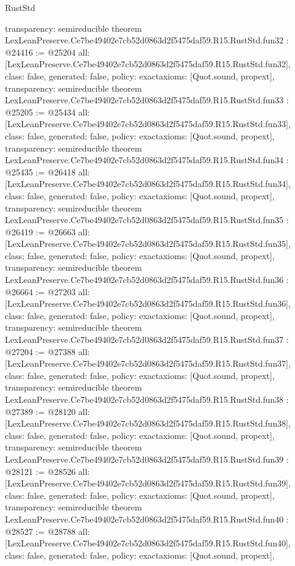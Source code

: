 \begin{lexlean}{RustStd}
\begin{coremodule}
{  transparency: semireducible
}
theorem LexLeanPreserve.Ce7be49402e7cb52d0863d2f5475daf59.R15.RustStd.fun32 : @24416 := @25204 {
  all: [LexLeanPreserve.Ce7be49402e7cb52d0863d2f5475daf59.R15.RustStd.fun32],
  class: false,
  generated: false,
  policy: exact{axioms: [Quot.sound, propext]},
  transparency: semireducible
}
theorem LexLeanPreserve.Ce7be49402e7cb52d0863d2f5475daf59.R15.RustStd.fun33 : @25205 := @25434 {
  all: [LexLeanPreserve.Ce7be49402e7cb52d0863d2f5475daf59.R15.RustStd.fun33],
  class: false,
  generated: false,
  policy: exact{axioms: [Quot.sound, propext]},
  transparency: semireducible
}
theorem LexLeanPreserve.Ce7be49402e7cb52d0863d2f5475daf59.R15.RustStd.fun34 : @25435 := @26418 {
  all: [LexLeanPreserve.Ce7be49402e7cb52d0863d2f5475daf59.R15.RustStd.fun34],
  class: false,
  generated: false,
  policy: exact{axioms: [Quot.sound, propext]},
  transparency: semireducible
}
theorem LexLeanPreserve.Ce7be49402e7cb52d0863d2f5475daf59.R15.RustStd.fun35 : @26419 := @26663 {
  all: [LexLeanPreserve.Ce7be49402e7cb52d0863d2f5475daf59.R15.RustStd.fun35],
  class: false,
  generated: false,
  policy: exact{axioms: [Quot.sound, propext]},
  transparency: semireducible
}
theorem LexLeanPreserve.Ce7be49402e7cb52d0863d2f5475daf59.R15.RustStd.fun36 : @26664 := @27203 {
  all: [LexLeanPreserve.Ce7be49402e7cb52d0863d2f5475daf59.R15.RustStd.fun36],
  class: false,
  generated: false,
  policy: exact{axioms: [Quot.sound, propext]},
  transparency: semireducible
}
theorem LexLeanPreserve.Ce7be49402e7cb52d0863d2f5475daf59.R15.RustStd.fun37 : @27204 := @27388 {
  all: [LexLeanPreserve.Ce7be49402e7cb52d0863d2f5475daf59.R15.RustStd.fun37],
  class: false,
  generated: false,
  policy: exact{axioms: [Quot.sound, propext]},
  transparency: semireducible
}
theorem LexLeanPreserve.Ce7be49402e7cb52d0863d2f5475daf59.R15.RustStd.fun38 : @27389 := @28120 {
  all: [LexLeanPreserve.Ce7be49402e7cb52d0863d2f5475daf59.R15.RustStd.fun38],
  class: false,
  generated: false,
  policy: exact{axioms: [Quot.sound, propext]},
  transparency: semireducible
}
theorem LexLeanPreserve.Ce7be49402e7cb52d0863d2f5475daf59.R15.RustStd.fun39 : @28121 := @28526 {
  all: [LexLeanPreserve.Ce7be49402e7cb52d0863d2f5475daf59.R15.RustStd.fun39],
  class: false,
  generated: false,
  policy: exact{axioms: [Quot.sound, propext]},
  transparency: semireducible
}
theorem LexLeanPreserve.Ce7be49402e7cb52d0863d2f5475daf59.R15.RustStd.fun40 : @28527 := @28788 {
  all: [LexLeanPreserve.Ce7be49402e7cb52d0863d2f5475daf59.R15.RustStd.fun40],
  class: false,
  generated: false,
  policy: exact{axioms: [Quot.sound, propext]},
}
\end{coremodule}
\end{lexlean}
